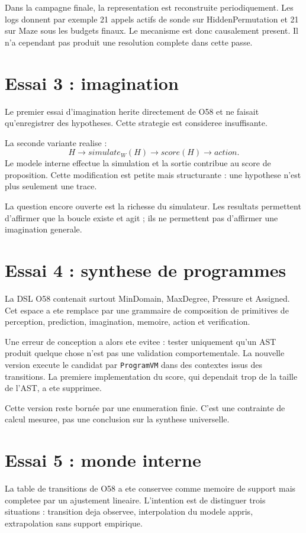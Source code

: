\documentclass[11pt,a4paper]{article}
\begin{document}
Dans la campagne finale, la representation est reconstruite periodiquement. Les logs donnent par exemple 21 appels actifs de sonde sur HiddenPermutation et 21 sur Maze sous les budgets finaux. Le mecanisme est donc causalement present. Il n'a cependant pas produit une resolution complete dans cette passe.

\section{Essai 3 : imagination}
Le premier essai d'imagination herite directement de O58 et ne faisait qu'enregistrer des hypotheses. Cette strategie est consideree insuffisante.

La seconde variante realise :
\[
H\to simulate_W(H)\to score(H)\to action.
\]
Le modele interne effectue la simulation et la sortie contribue au score de proposition. Cette modification est petite mais structurante : une hypothese n'est plus seulement une trace.

La question encore ouverte est la richesse du simulateur. Les resultats permettent d'affirmer que la boucle existe et agit ; ils ne permettent pas d'affirmer une imagination generale.

\section{Essai 4 : synthese de programmes}
La DSL O58 contenait surtout MinDomain, MaxDegree, Pressure et Assigned. Cet espace a ete remplace par une grammaire de composition de primitives de perception, prediction, imagination, memoire, action et verification.

Une erreur de conception a alors ete evitee : tester uniquement qu'un AST produit quelque chose n'est pas une validation comportementale. La nouvelle version execute le candidat par \texttt{ProgramVM} dans des contextes issus des transitions. La premiere implementation du score, qui dependait trop de la taille de l'AST, a ete supprimee.

Cette version reste bornée par une enumeration finie. C'est une contrainte de calcul mesuree, pas une conclusion sur la synthese universelle.

\section{Essai 5 : monde interne}
La table de transitions de O58 a ete conservee comme memoire de support mais completee par un ajustement lineaire. L'intention est de distinguer trois situations : transition deja observee, interpolation du modele appris, extrapolation sans support empirique.
\end{document}

